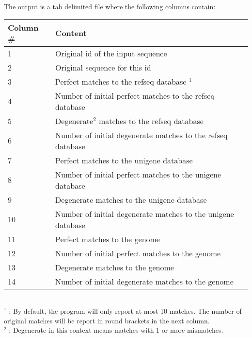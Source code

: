 \documentclass[a4paper,12pt]{article}
\begin{document}
The output is a tab delimited file where the following columns contain: \\
\begin{tabular}{ll}
\hline
Column \# & Content \\
\hline
1 & Original id of the input sequence \\
2 & Original sequence for this id \\
3 & Perfect matches to the refseq database $^1$ \\
4 & Number of initial perfect matches to the refseq database \\
5 & Degenerate$^2$ matches to the refseq database  \\
6 & Number of initial degenerate matches to the refseq database \\
7 & Perfect matches to the unigene database  \\
8 & Number of initial perfect matches to the unigene database \\
9 & Degenerate matches to the unigene database  \\
10 & Number of initial degenerate matches to the unigene database \\
11 & Perfect matches to the genome  \\
12 & Number of initial perfect matches to the genome \\
13 & Degenerate matches to the genome  \\
14 & Number of initial degenerate matches to the genome \\
\hline
\end{tabular}
\\
$^1$ : By default, the program will only report at most 10 matches. The number of original matches will be report in round brackets in the next column. \\
$^2$ : Degenerate in this context means matches with 1 or more mismatches.
\end{document}
